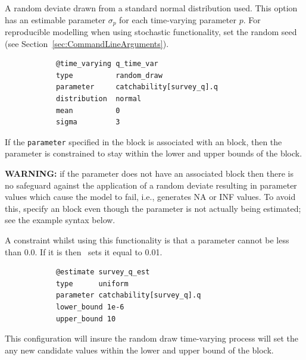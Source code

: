 \subsubsection[Random Draw]{}\label{sec:TimeVarying-RandomDraw}

A random deviate drawn from a standard normal distribution used. This option has an estimable parameter $\sigma_p$ for each time-varying parameter $p$. For reproducible modelling when using stochastic functionality, set the random seed (see Section~\ref{sec:CommandLineArguments}).

{\small{\begin{verbatim}
			@time_varying q_time_var
			type          random_draw
			parameter     catchability[survey_q].q
			distribution  normal
			mean          0
			sigma         3
\end{verbatim}}}

If the \texttt{parameter} specified in the  block is associated with an  block, then the parameter is constrained to stay within the lower and upper bounds of the  block.

\textbf{WARNING:} if the parameter does not have an associated  block then there is no safeguard against the application of a random deviate resulting in parameter values which cause the model to fail, i.e., generates NA or INF values. To avoid this, specify an  block even though the parameter is not actually being estimated; see the example syntax below.

A constraint whilst using this functionality is that a parameter cannot be less than 0.0. If it is then \CNAME\ sets it equal to 0.01.

{\small{\begin{verbatim}
			@estimate survey_q_est
			type      uniform
			parameter catchability[survey_q].q
			lower_bound 1e-6
			upper_bound 10
\end{verbatim}}}

This configuration will insure the random draw time-varying process will set the any new candidate values within the lower and upper bound of the  block.

\subsection{\label{sec:eq_parser}} 

